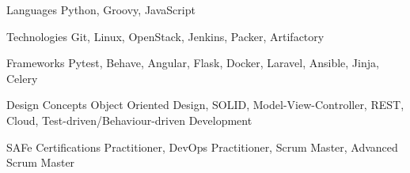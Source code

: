 
\begin{cvskills}
  \cvskill
    {Languages} %
    {Python, Groovy, JavaScript} %

  \cvskill
    {Technologies} %
    {Git, Linux, OpenStack, Jenkins, Packer, Artifactory} %

  \cvskill
    {Frameworks} %
    {
        Pytest,
        Behave,
        Angular,
        Flask,
        Docker,
        Laravel,
        Ansible,
        Jinja,
        Celery
    } %

  \cvskill
    {Design Concepts}
    {
        Object Oriented Design,
        SOLID,
        Model-View-Controller,
        REST,
        Cloud,
        Test-driven/Behaviour-driven Development
    }

  \cvskill
    {SAFe Certifications}
    { Practitioner, DevOps Practitioner, Scrum Master, Advanced Scrum Master }

\end{cvskills}
